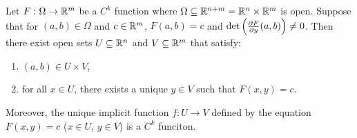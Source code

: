 \begin{theorem}
    Let $F: \Omega \to \mathbb{R}^m$ be a $C^k$ function where $\Omega \subseteq \mathbb{R}^{n + m} = \mathbb{R}^n \times \mathbb{R}^m$ is open. Suppose that for $(a,b) \in \Omega$ and $c \in \mathbb{R}^m$, $F(a,b) = c$ and $\det \left(\frac{\partial F}{\partial y}(a,b)\right) \neq 0$. Then there exist open sets $U \subseteq \mathbb{R}^n$ and $V \subseteq \mathbb{R}^m$ that satisfy:
    \begin{enumerate}
        \item $(a,b) \in U \times V$,
        \item for all $x \in U$, there exists a unique $y \in V$ such that $F(x,y) = c$.
    \end{enumerate}
    Moreover, the unique implicit function $f: U \to V$ defined by the equation $F(x,y) = c$ ($x \in U$, $y \in V$) is a $C^k$ funciton.
\end{theorem}
